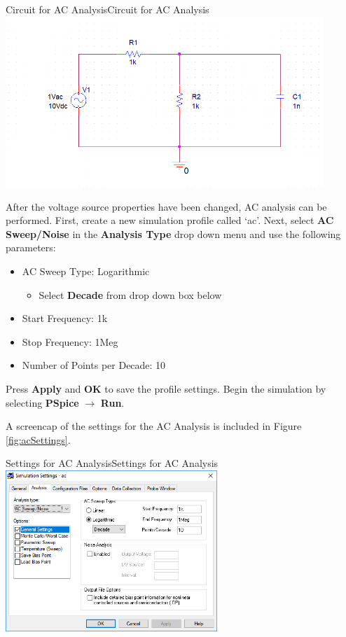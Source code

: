 \documentclass[12pt]{../manual}
\begin{document}
\begin{myfigure}[colback=white,label=fig:acCircuit]{Circuit for AC Analysis}{Circuit for AC Analysis}
\centering
\includegraphics[width=0.9\textwidth]{figures/ACAnalysisCircuitCrop.PNG}
\end{myfigure}

After the voltage source properties have been changed, AC analysis can be performed. First, create a new simulation profile called `ac'. Next, select \textbf{AC Sweep/Noise} in the \textbf{Analysis Type} drop down menu and use the following parameters:
\begin{itemize}
\item AC Sweep Type: Logarithmic 
\begin{itemize}
\item Select \textbf{Decade} from drop down box below
\end{itemize}
\item Start Frequency: 1k
\item Stop Frequency: 1Meg
\item Number of Points per Decade: 10
\end{itemize}
Press \textbf{Apply} and \textbf{OK} to save the profile settings. Begin the simulation by selecting \textbf{PSpice} $\to$ \textbf{Run}.

A screencap of the settings for the AC Analysis is included in Figure \ref{fig:acSettings}.

\begin{myfigure}[label=fig:acSettings]{Settings for AC Analysis}{Settings for AC Analysis}
\centering
\includegraphics[width=0.6\textwidth]{figures/ACAnalysisSettings.PNG}
\end{myfigure}
\end{document}
